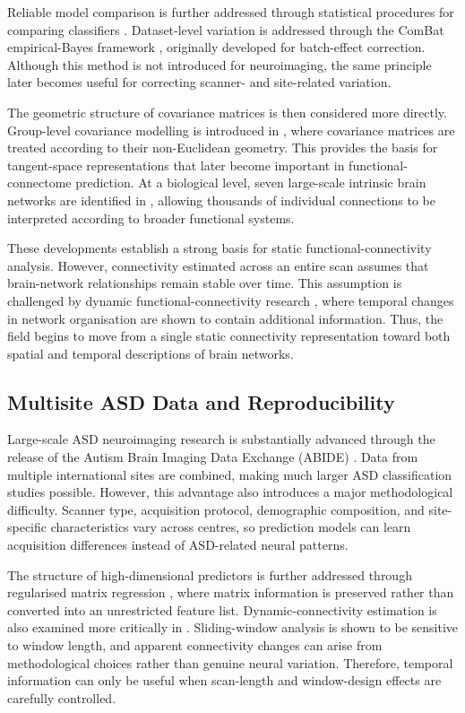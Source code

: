 \documentclass[a4paper,fleqn]{cas-sc}
\begin{document}
Reliable model comparison is further addressed through statistical procedures for comparing classifiers \cite{Demsar2006}. Dataset-level variation is addressed through the ComBat empirical-Bayes framework \cite{Johnsonetal2007}, originally developed for batch-effect correction. Although this method is not introduced for neuroimaging, the same principle later becomes useful for correcting scanner- and site-related variation.

The geometric structure of covariance matrices is then considered more directly. Group-level covariance modelling is introduced in \cite{Varoquauxetal2010}, where covariance matrices are treated according to their non-Euclidean geometry. This provides the basis for tangent-space representations that later become important in functional-connectome prediction. At a biological level, seven large-scale intrinsic brain networks are identified in \cite{Yeoetal2011}, allowing thousands of individual connections to be interpreted according to broader functional systems.

These developments establish a strong basis for static functional-connectivity analysis. However, connectivity estimated across an entire scan assumes that brain-network relationships remain stable over time. This assumption is challenged by dynamic functional-connectivity research \cite{Hutchisonetal2013}, where temporal changes in network organisation are shown to contain additional information. Thus, the field begins to move from a single static connectivity representation toward both spatial and temporal descriptions of brain networks.

\subsection{Multisite ASD Data and Reproducibility}

Large-scale ASD neuroimaging research is substantially advanced through the release of the Autism Brain Imaging Data Exchange (ABIDE) \cite{DiMartinoetal2014}. Data from multiple international sites are combined, making much larger ASD classification studies possible. However, this advantage also introduces a major methodological difficulty. Scanner type, acquisition protocol, demographic composition, and site-specific characteristics vary across centres, so prediction models can learn acquisition differences instead of ASD-related neural patterns.

The structure of high-dimensional predictors is further addressed through regularised matrix regression \cite{ZhouLi2014}, where matrix information is preserved rather than converted into an unrestricted feature list. Dynamic-connectivity estimation is also examined more critically in \cite{LeonardiVanDeVille2015}. Sliding-window analysis is shown to be sensitive to window length, and apparent connectivity changes can arise from methodological choices rather than genuine neural variation. Therefore, temporal information can only be useful when scan-length and window-design effects are carefully controlled.
\end{document}
